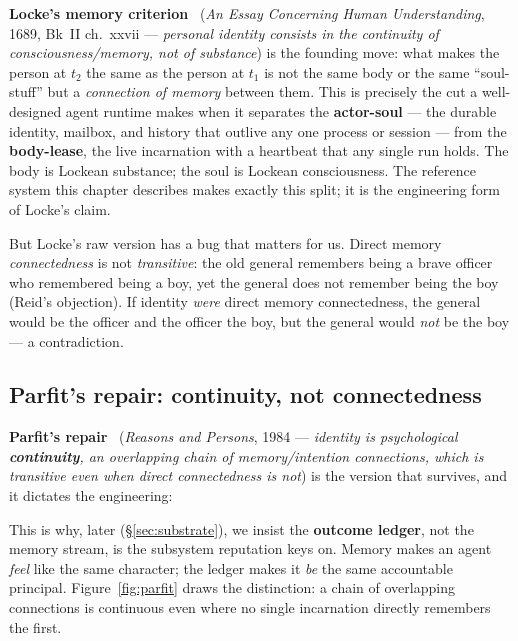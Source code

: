 \documentclass[11pt,a4paper]{article}
\theoremstyle{definition}
\begin{document}
\textbf{Locke's memory criterion}~ (\textit{An Essay Concerning
Human Understanding}, 1689, Bk~II ch.~xxvii --- \emph{personal identity consists
in the continuity of consciousness/memory, not of substance}) is the founding
move: what makes the person at $t_2$ the same as the person at $t_1$ is not the
same body or the same ``soul-stuff'' but a \emph{connection of memory} between
them. This is precisely the cut a well-designed agent runtime makes when it
separates the \textbf{actor-soul} --- the durable identity, mailbox, and history
that outlive any one process or session --- from the \textbf{body-lease}, the live
incarnation with a heartbeat that any single run holds. The body is Lockean
substance; the soul is Lockean consciousness. The reference system this chapter
describes makes exactly this split; it is the engineering form of Locke's claim.

But Locke's raw version has a bug that matters for us. Direct memory
\emph{connectedness} is not \emph{transitive}: the old general remembers being a
brave officer who remembered being a boy, yet the general does not remember being
the boy (Reid's objection). If identity \emph{were} direct memory connectedness,
the general would be the officer and the officer the boy, but the general would
\emph{not} be the boy --- a contradiction.

\subsection{Parfit's repair: continuity, not connectedness}

%
\textbf{Parfit's repair}~ (\textit{Reasons and Persons}, 1984 ---
\emph{identity is psychological \textbf{continuity}, an overlapping chain of
memory/intention connections, which is transitive even when direct connectedness
is not}) is the version that survives, and it dictates the engineering:


\noindent This is why, later (\S\ref{sec:substrate}), we insist the
\textbf{outcome ledger}, not the memory stream, is the subsystem reputation keys on.
Memory makes an agent \emph{feel} like the same character; the ledger makes it
\emph{be} the same accountable principal. Figure~\ref{fig:parfit} draws the
distinction: a chain of overlapping connections is continuous even where no single
incarnation directly remembers the first.
\end{document}

